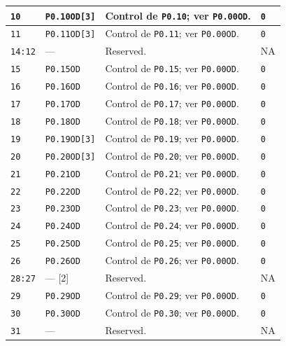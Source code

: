\begin{longtable}{|>{\raggedright\arraybackslash}p{}|>{\raggedright\arraybackslash}p{}|>{\raggedright\arraybackslash}p{}|>{\centering\arraybackslash}p{}|}
\hline
\texttt{10} & \texttt{P0.10OD[3]} & Control de \texttt{P0.10}; ver \texttt{P0.00OD}. & \texttt{0} \\
\hline
\texttt{11} & \texttt{P0.11OD[3]} & Control de \texttt{P0.11}; ver \texttt{P0.00OD}. & \texttt{0} \\
\hline
\texttt{14:12} & --- & Reserved. & NA \\
\hline
\texttt{15} & \texttt{P0.15OD} & Control de \texttt{P0.15}; ver \texttt{P0.00OD}. & \texttt{0} \\
\hline
\texttt{16} & \texttt{P0.16OD} & Control de \texttt{P0.16}; ver \texttt{P0.00OD}. & \texttt{0} \\
\hline
\texttt{17} & \texttt{P0.17OD} & Control de \texttt{P0.17}; ver \texttt{P0.00OD}. & \texttt{0} \\
\hline
\texttt{18} & \texttt{P0.18OD} & Control de \texttt{P0.18}; ver \texttt{P0.00OD}. & \texttt{0} \\
\hline
\texttt{19} & \texttt{P0.19OD[3]} & Control de \texttt{P0.19}; ver \texttt{P0.00OD}. & \texttt{0} \\
\hline
\texttt{20} & \texttt{P0.20OD[3]} & Control de \texttt{P0.20}; ver \texttt{P0.00OD}. & \texttt{0} \\
\hline
\texttt{21} & \texttt{P0.21OD} & Control de \texttt{P0.21}; ver \texttt{P0.00OD}. & \texttt{0} \\
\hline
\texttt{22} & \texttt{P0.22OD} & Control de \texttt{P0.22}; ver \texttt{P0.00OD}. & \texttt{0} \\
\hline
\texttt{23} & \texttt{P0.23OD} & Control de \texttt{P0.23}; ver \texttt{P0.00OD}. & \texttt{0} \\
\hline
\texttt{24} & \texttt{P0.24OD} & Control de \texttt{P0.24}; ver \texttt{P0.00OD}. & \texttt{0} \\
\hline
\texttt{25} & \texttt{P0.25OD} & Control de \texttt{P0.25}; ver \texttt{P0.00OD}. & \texttt{0} \\
\hline
\texttt{26} & \texttt{P0.26OD} & Control de \texttt{P0.26}; ver \texttt{P0.00OD}. & \texttt{0} \\
\hline
\texttt{28:27} & --- [2] & Reserved. & NA \\
\hline
\texttt{29} & \texttt{P0.29OD} & Control de \texttt{P0.29}; ver \texttt{P0.00OD}. & \texttt{0} \\
\hline
\texttt{30} & \texttt{P0.30OD} & Control de \texttt{P0.30}; ver \texttt{P0.00OD}. & \texttt{0} \\
\hline
\texttt{31} & --- & Reserved. & NA \\
\hline
\end{longtable}
